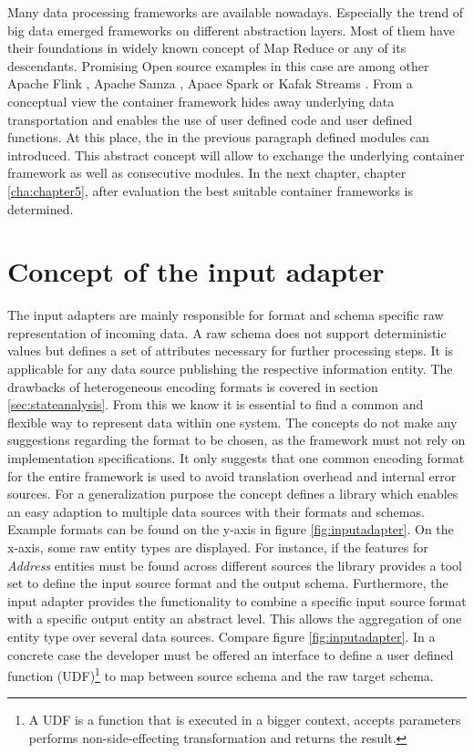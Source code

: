 Many data processing frameworks are available nowadays. Especially the trend of big data emerged frameworks on different abstraction layers. Most of them have their foundations in widely known concept of Map Reduce \cite{dean_ghemawat_2008} or any of its descendants. Promising Open source examples in this case are among other Apache Flink \cite{flink_2017}, Apache Samza \cite{samza_2017}, Apace Spark \cite{spark_2017} or Kafak Streams \cite{kafka_2017}. From a conceptual view the container framework hides away underlying data transportation and enables the use of user defined code and user defined functions. At this place, the in the previous paragraph defined modules can introduced. This abstract concept will allow to exchange the underlying container framework as well as consecutive modules. In the next chapter, chapter \ref{cha:chapter5}, after evaluation the best suitable container frameworks is determined.

\section{Concept of the input adapter \label{sec:inputadapter}}

The input adapters are mainly responsible for format and schema specific raw representation of incoming data. A raw schema does not support deterministic values but defines a set of attributes necessary for further processing steps. It is applicable for any data source publishing the respective information entity. The drawbacks of heterogeneous encoding formats is covered in section \ref{sec:stateanalysis}. From this we know it is essential to find a common and flexible way to represent data within one system. The concepts do not make any suggestions regarding the format to be chosen, as the framework must not rely on implementation specifications. It only suggests that one common encoding format for the entire framework is used to avoid translation overhead and internal error sources. For a generalization purpose the concept defines a library which enables an easy adaption to multiple data sources with their formats and schemas. Example formats can be found on the y-axis in figure \ref{fig:inputadapter}. On the x-axis, some raw entity types are displayed. For instance, if the features for \textit{Address} entities must be found across different sources the library provides a tool set to define the input source format and the output schema. Furthermore, the input adapter provides the functionality to combine a specific input source format with a specific output entity an abstract level. This allows the aggregation of one entity type over several data sources. Compare figure \ref{fig:inputadapter}. In a concrete case the developer must be offered an interface to define a user defined function (UDF)\footnote{A UDF is a function that is executed in a bigger context, accepts parameters performs non-side-effecting transformation and returns the result.} to map between source schema and the raw target schema. 

